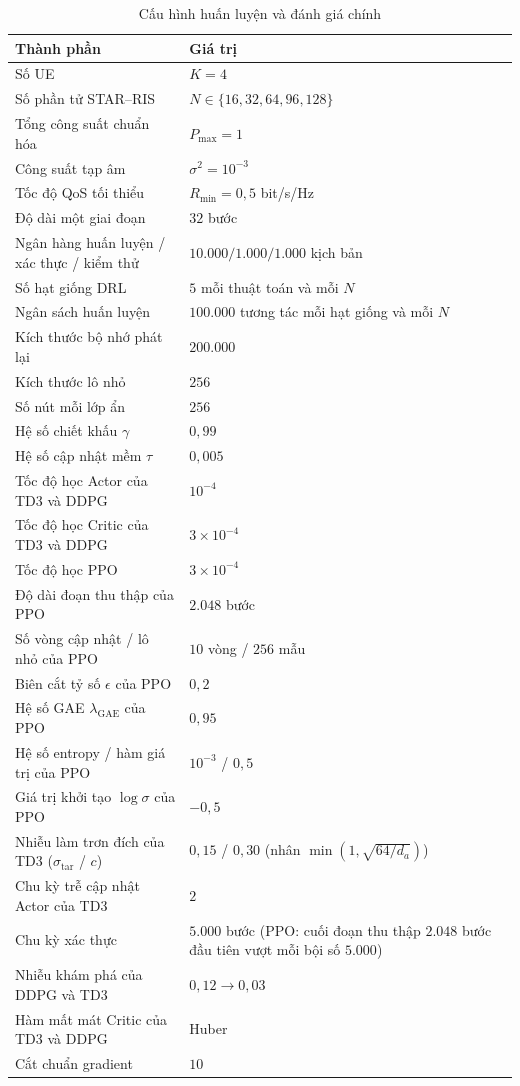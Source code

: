 \begin{table}[htbp]
\centering
\caption{Cấu hình huấn luyện và đánh giá chính}
\label{tab:ch3-cau-hinh}
\footnotesize
\begin{tabularx}{\textwidth}{@{}X l@{}}
\toprule
\textbf{Thành phần} & \textbf{Giá trị} \\
\midrule
Số UE & $K = 4$ \\
Số phần tử STAR--RIS & $N \in \{16, 32, 64, 96, 128\}$ \\
Tổng công suất chuẩn hóa & $P_{\max} = 1$ \\
Công suất tạp âm & $\sigma^2 = 10^{-3}$ \\
Tốc độ QoS tối thiểu & $R_{\min} = 0,5$ bit/s/Hz \\
Độ dài một giai đoạn & $32$ bước \\
Ngân hàng huấn luyện / xác thực / kiểm thử & $10.000 / 1.000 / 1.000$ kịch bản \\
Số hạt giống DRL & $5$ mỗi thuật toán và mỗi $N$ \\
Ngân sách huấn luyện & $100.000$ tương tác mỗi hạt giống và mỗi $N$ \\
Kích thước bộ nhớ phát lại & $200.000$ \\
Kích thước lô nhỏ & $256$ \\
Số nút mỗi lớp ẩn & $256$ \\
Hệ số chiết khấu $\gamma$ & $0,99$ \\
Hệ số cập nhật mềm $\tau$ & $0,005$ \\
Tốc độ học Actor của TD3 và DDPG & $10^{-4}$ \\
Tốc độ học Critic của TD3 và DDPG & $3 \times 10^{-4}$ \\
Tốc độ học PPO & $3 \times 10^{-4}$ \\
Độ dài đoạn thu thập của PPO & $2.048$ bước \\
Số vòng cập nhật / lô nhỏ của PPO & $10$ vòng / $256$ mẫu \\
Biên cắt tỷ số $\epsilon$ của PPO & $0,2$ \\
Hệ số GAE $\lambda_{\mathrm{GAE}}$ của PPO & $0,95$ \\
Hệ số entropy / hàm giá trị của PPO & $10^{-3}$ / $0,5$ \\
Giá trị khởi tạo $\log\sigma$ của PPO & $-0,5$ \\
Nhiễu làm trơn đích của TD3 ($\sigma_{\mathrm{tar}}$ / $c$) & $0,15$ / $0,30$ (nhân $\min(1,\sqrt{64/d_a})$) \\
Chu kỳ trễ cập nhật Actor của TD3 & $2$ \\
Chu kỳ xác thực & $5.000$ bước (PPO: cuối đoạn thu thập $2.048$ bước đầu tiên vượt mỗi bội số $5.000$) \\
Nhiễu khám phá của DDPG và TD3 & $0,12 \rightarrow 0,03$ \\
Hàm mất mát Critic của TD3 và DDPG & Huber \\
Cắt chuẩn gradient & $10$ \\
\bottomrule
\end{tabularx}
\end{table}

